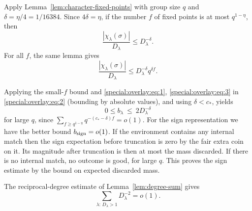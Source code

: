 Apply Lemma~\ref{lem:character-fixed-points} with group size \(q\) and \(\delta=\eta/4=1/16384\). Since \(4\delta=\eta\), if the number \(f\) of fixed points is at most \(q^{1-\eta}\), then
\[
 \frac{|\chi_\lambda(\sigma)|}{D_\lambda}\le D_\lambda^{-\delta}.
\]
For all \(f\), the same lemma gives
\begin{equation}
 \frac{|\chi_\lambda(\sigma)|}{D_\lambda}
      \le D_\lambda^{-\delta}q^{\delta f}.\label{special:overlay:eq:3}
\end{equation}

Applying the small-\(f\) bound and \eqref{special:overlay:eq:1}, \eqref{special:overlay:eq:3} in \eqref{special:overlay:eq:2} (bounding by absolute values), and using \(\delta<c_*\), yields
\begin{equation}
 0\le b_\lambda\ \le\ 2D_\lambda^{-\delta}                             \label{special:overlay:eq:4}
\end{equation}
for large \(q\), since \(\sum_{f\ge q^{1-\eta}} q^{-(c_*-\delta) f}=o(1)\). For the sign representation we have the better bound \(b_{\rm sign}=o(1)\). If the environment contains any internal match then the sign expectation before truncation is zero by the fair extra coin on it. Its magnitude after truncation is then at most the mass discarded. If there is no internal match, no outcome is good, for large \(q\). This proves the sign estimate by the bound on expected discarded mass.

The reciprocal-degree estimate of Lemma~\ref{lem:degree-sum} gives
\begin{equation}
 \sum_{\lambda:\,D_\lambda>1}D_\lambda^{-2}=o(1).
 \label{special:overlay:eq:5}
\end{equation}

